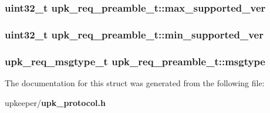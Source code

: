 \subsubsection{\setlength{\rightskip}{0pt plus 5cm}uint32\_\-t \bf{upk\_\-req\_\-preamble\_\-t::max\_\-supported\_\-ver}}\label{structupk__req__preamble__t_63eef443b72aaf907860dbb71ef293b6}


\subsubsection{\setlength{\rightskip}{0pt plus 5cm}uint32\_\-t \bf{upk\_\-req\_\-preamble\_\-t::min\_\-supported\_\-ver}}\label{structupk__req__preamble__t_67cbae70361caa0c7bf1c4c80275fa9e}


\subsubsection{\setlength{\rightskip}{0pt plus 5cm}\bf{upk\_\-req\_\-msgtype\_\-t} \bf{upk\_\-req\_\-preamble\_\-t::msgtype}}\label{structupk__req__preamble__t_50f755ded575f39f76e0f048ab116906}




The documentation for this struct was generated from the following file:\begin{CompactItemize}
\item 
upkeeper/\bf{upk\_\-protocol.h}\end{CompactItemize}
